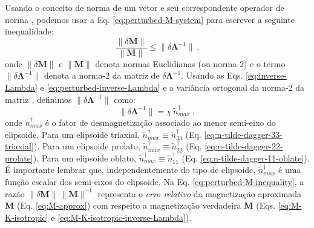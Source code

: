 Usando o conceito de norma de um vetor e seu correspondente operador de norma \citep{demmel1997, golub2013}, podemos usar a Eq.
\ref{eq:perturbed-M-system} para escrever a seguinte inequalidade:
\begin{equation}
\frac{\| \delta \mathbf{M} \|}{\| \mathbf{M} \|} \leq
\| \delta \mathbf{\Lambda}^{-1} \| \: .
\label{eq:perturbed-M-inequality}
\end{equation}
onde $\| \delta \mathbf{M} \|$ e $\| \mathbf{M} \|$
denota normas Euclidianas (ou norma-2) e o termo 
$\| \delta \mathbf{\Lambda}^{-1} \|$ denota a norma-2 da matriz
de $\delta \mathbf{\Lambda}^{-1}$.
Usando as Eqs. \ref{eq:inverse-Lambda} e \ref{eq:perturbed-inverse-Lambda}
e a variância ortogonal da norma-2 da matriz
\citep{demmel1997, golub2013}, definimos
$\| \delta \mathbf{\Lambda}^{-1} \|$ como:
\begin{equation}
\| \delta \mathbf{\Lambda}^{-1} \| = \chi \,
\tilde{n}^{\dagger}_{max} \: ,
\label{eq:norm-perturbed-inverse-Lambda}
\end{equation}
onde $\tilde{n}^{\dagger}_{max}$ é o fator de desmagnetização
associado ao menor semi-eixo do elipsoide.
Para um elipsoide triaxial, 
$\tilde{n}^{\dagger}_{max} \equiv \tilde{n}^{\dagger}_{33}$
(Eq. \ref{eq:n-tilde-dagger-33-triaxial}). Para um elipsoide prolato,
$\tilde{n}^{\dagger}_{max} \equiv \tilde{n}^{\dagger}_{22}$
(Eq. \ref{eq:n-tilde-dagger-22-prolate}). 
Para um elipsoide oblato,
$\tilde{n}^{\dagger}_{max} \equiv \tilde{n}^{\dagger}_{11}$
(Eq. \ref{eq:n-tilde-dagger-11-oblate}).
É importante lembrar que, independentemente do tipo de elipsoide, $\tilde{n}^{\dagger}_{max}$ é
uma função escalar dos semi-eixos do elipsoide.
Na Eq. \ref{eq:perturbed-M-inequality}, a razão
$\| \delta \mathbf{M} \| \, \| \mathbf{M} \|^{-1}$ representa o
\textit{erro relativo} da magnetização aproximada
$\breve{\mathbf{M}}$ (Eq. \ref{eq:M-approx}) com respeito a magnetização verdadeira
$\mathbf{M}$ (Eqs. \ref{eq:M-K-isotropic}
e \ref{eq:M-K-isotropic-inverse-Lambda}).

